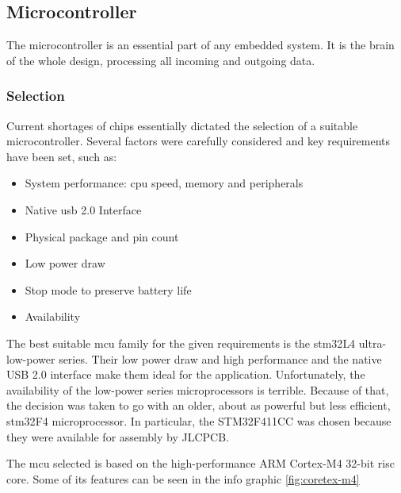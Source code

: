 \clearpage

\subsection{Microcontroller} \label{microcontroller}
The microcontroller is an essential part of any embedded system. It is the brain of the whole design, processing all incoming and outgoing data.  
\subsubsection{Selection}
Current shortages of chips essentially dictated the selection of a suitable microcontroller. Several factors were carefully considered and key requirements have been set, such as:

\begin{itemize}
		\item System performance: \acrshort{cpu} speed, memory and peripherals
		\item Native \acrshort{usb} 2.0 Interface
		\item Physical package and pin count
		\item Low power draw
		\item Stop mode to preserve battery life
		\item Availability
\end{itemize}

The best suitable \acrshort{mcu} family for the given requirements is the \gls{stm32}L4 ultra-low-power series. Their low power draw and high performance and the native USB 2.0 interface make them ideal for the application. Unfortunately, the availability of the low-power series microprocessors is terrible. Because of that, the decision was taken to go with an older, about as powerful but less efficient, \gls{stm32}F4 microprocessor. In particular, the STM32F411CC was chosen because they were available for assembly by JLCPCB.   

The \acrshort{mcu} selected is based on the high-performance ARM Cortex-M4 32-bit \acrshort{risc} core. Some of its features can be seen in the info graphic \ref{fig:coretex-m4}

